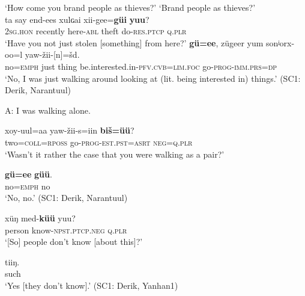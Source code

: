 \documentclass[output=paper,colorlinks,citecolor=brown,chinesefont]{langscibook}
\begin{document}
\ea\label{ex:kha:55}
    \begin{xlist}
     ‘How come you brand people as thieves?’
    \label{ex:kha:55a} ‘Brand people as thieves?’ \\
        \gll ta say end-ees xulɢai xii-gee=\textbf{güi} \textbf{yuu}? \\ 
             \textsc{2sg.hon} recently here-\textsc{abl} theft do-\textsc{res.ptcp} \textsc{q.plr} \\
        \glt ‘Have you not just stolen [something] from here?’
    \label{ex:kha:55b}
        \gll \textbf{gü=ee}, zügeer yum sonʲorx-oo=l yaw-žii-[n]=šd. \\ 
             no=\textsc{emph} just thing be.interested.in-\textsc{pfv.cvb=lim.foc} go-\textsc{prog-imm.prs=dp} \\
        \glt ‘No, I was just walking around looking at (lit. being interested in) things.’ (SC1: Derik, Narantuul)
    \end{xlist}
\z 

\ea\label{ex:kha:56} A: I was walking alone. \\ 
    \begin{xlist}
    \label{ex:kha:56a}
        \gll xoy-uul=aa yaw-žii-s=iin \textbf{biš=üü}? \\
             two=\textsc{coll=rposs} go-\textsc{prog-est.pst=asrt} \textsc{neg=q.plr} \\
        \glt ‘Wasn’t it rather the case that you were walking as a pair?’
    
    \label{ex:kha:56b} 
        \gll \textbf{gü=ee} \textbf{güü}. \\
             no=\textsc{emph} no \\
        \glt ‘No, no.’ (SC1: Derik, Narantuul)
    \end{xlist}
\z 

\ea\label{ex:kha:57}
    \begin{xlist}
    \label{ex:kha:57a}
        \gll xüŋ med-\textbf{küü} yuu? \\ 
             person know-\textsc{npst.ptcp.neg} \textsc{q.plr} \\
        \glt ‘[So] people don’t know [about this]?’ 
    
    \label{ex:kha:57b}
        \gll tiiŋ. \\
             such \\
        \glt ‘Yes [they don’t know].’ (SC1: Derik, Yanhan1) 
    \end{xlist}
\z  
\end{document}
